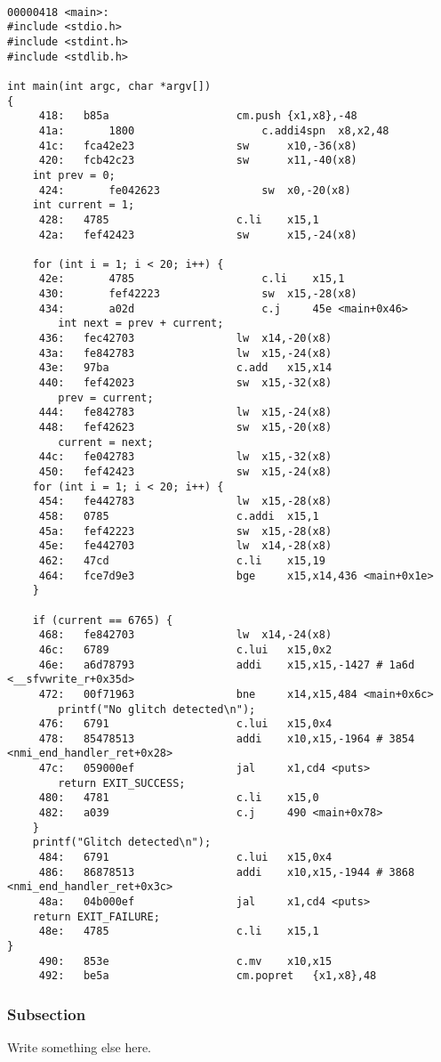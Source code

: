 \begin{lstlisting}[caption={Assembly code for coverage test program}, label=lst:asm_coverage, language=riscv]

00000418 <main>:
#include <stdio.h>
#include <stdint.h>
#include <stdlib.h>

int main(int argc, char *argv[])
{
     418:	b85a                    cm.push {x1,x8},-48
     41a:       1800                    c.addi4spn	x8,x2,48
     41c:	fca42e23                sw      x10,-36(x8)
     420:	fcb42c23                sw      x11,-40(x8)
    int prev = 0;
     424:       fe042623                sw	x0,-20(x8)
    int current = 1;
     428:	4785                    c.li    x15,1
     42a:	fef42423                sw      x15,-24(x8)

    for (int i = 1; i < 20; i++) {
     42e:       4785                    c.li    x15,1
     430:       fef42223                sw	x15,-28(x8)
     434:       a02d                    c.j     45e <main+0x46>
        int next = prev + current;
     436:	fec42703                lw	x14,-20(x8)
     43a:	fe842783                lw	x15,-24(x8)
     43e:	97ba                    c.add   x15,x14
     440:	fef42023                sw	x15,-32(x8)
        prev = current;
     444:	fe842783                lw	x15,-24(x8)
     448:	fef42623                sw	x15,-20(x8)
        current = next;
     44c:	fe042783                lw	x15,-32(x8)
     450:	fef42423                sw	x15,-24(x8)
    for (int i = 1; i < 20; i++) {
     454:	fe442783                lw	x15,-28(x8)
     458:	0785                    c.addi  x15,1
     45a:	fef42223                sw	x15,-28(x8)
     45e:	fe442703                lw	x14,-28(x8)
     462:	47cd                    c.li    x15,19
     464:	fce7d9e3                bge     x15,x14,436 <main+0x1e>
    }

    if (current == 6765) {
     468:	fe842703                lw	x14,-24(x8)
     46c:	6789                    c.lui   x15,0x2
     46e:	a6d78793                addi    x15,x15,-1427 # 1a6d <__sfvwrite_r+0x35d>
     472:	00f71963                bne     x14,x15,484 <main+0x6c>
        printf("No glitch detected\n");
     476:	6791                    c.lui   x15,0x4
     478:	85478513                addi    x10,x15,-1964 # 3854 <nmi_end_handler_ret+0x28>
     47c:	059000ef                jal     x1,cd4 <puts>
        return EXIT_SUCCESS;
     480:	4781                    c.li    x15,0
     482:	a039                    c.j     490 <main+0x78>
    }
    printf("Glitch detected\n");
     484:	6791                    c.lui   x15,0x4
     486:	86878513                addi    x10,x15,-1944 # 3868 <nmi_end_handler_ret+0x3c>
     48a:	04b000ef                jal     x1,cd4 <puts>
    return EXIT_FAILURE;
     48e:	4785                    c.li    x15,1
}
     490:	853e                    c.mv    x10,x15
     492:	be5a                    cm.popret	{x1,x8},48
\end{lstlisting}

\subsubsection{Subsection}
Write something else here.